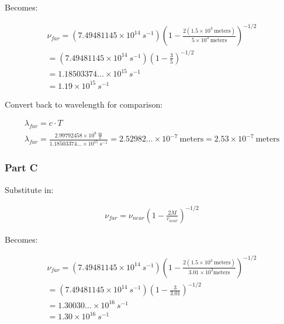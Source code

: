 \documentclass[]{report}
\begin{document}
          Becomes:

          \begin{equation*}
            \begin{split}
              \nu_{far} = (7.49481145\times10^{14}\ s^{-1})\left(1 - \frac{2(1.5\times10^3\ \text{meters})}{5\times10^3\ \text{meters}} \right)^{-1/2} \\
              = (7.49481145\times10^{14}\ s^{-1})\left(1 - \frac{3}{5} \right)^{-1/2}
              \\ = 1.18503374...\times10^{15}\ s^{-1}
              \\ = 1.19\times10^{15}\ s^{-1}
              \end{split}
            \end{equation*}

          Convert back to wavelength for comparison:

          \begin{equation*}
            \begin{split}
              \lambda_{far} = c\cdot T \\
              \lambda_{far} = \frac{2.99792458\times10^8\ \frac{\text{m}}{\text{s}}}{1.18503374...\times10^{15}\ s^{-1}} = 2.52982...\times10^{-7}\ \text{meters} = 2.53\times10^{-7}\ \text{meters}
              \end{split}
            \end{equation*}

        \subsubsection{Part C}
          Substitute in:

          \begin{equation*}
            \begin{split}
              \nu_{far} = \nu_{near}\left(1 - \frac{2M}{r_{near}} \right)^{-1/2}
              \end{split}
          \end{equation*}

          Becomes:

          \begin{equation*}
            \begin{split}
              \nu_{far} = (7.49481145\times10^{14}\ s^{-1})\left(1 - \frac{2(1.5\times10^3\ \text{meters})}{3.01\times10^3 \text{meters}} \right)^{-1/2}\\
              = (7.49481145\times10^{14}\ s^{-1})\left(1 - \frac{3}{3.01} \right)^{-1/2}
              \\ = 1.30030...\times10^{16}\ s^{-1}
              \\ = 1.30\times10^{16}\ s^{-1}
              \end{split}
          \end{equation*}
\end{document}
